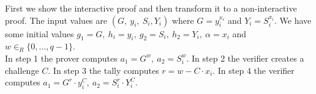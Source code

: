\noindent
First we show the interactive proof and then transform it to a non-interactive proof. The input values are \begin{math}(G,\ y_i,\ S_i, Y_i)\end{math} where \begin{math}G = y_i^{x_i}\end{math} and  \begin{math} Y_i=S_i^{x_i}\end{math}. We have some initial values
 \begin{math}g_1 =G,\ h_i=y_i,\ g_2=S_i,\ h_2=Y_i,\ \alpha=x_i \end{math} and \begin{math}w \in_R \{0,...,q-1\}\end{math}.\\
 
 
 
\noindent 
In step 1 the prover computes \begin{math}a_1=G^w,\ a_2=S_i^w\end{math}. In step 2
the verifier creates a challenge \begin{math}C\end{math}. In step 3 the tally computes \begin{math}r=w-C \cdot x_i\end{math}. In step 4 the verifier computes \begin{math}a_1=G^r \cdot y_i^C,\ a_2=S_i^r \cdot Y_i^C\end{math}.
 
 
 
